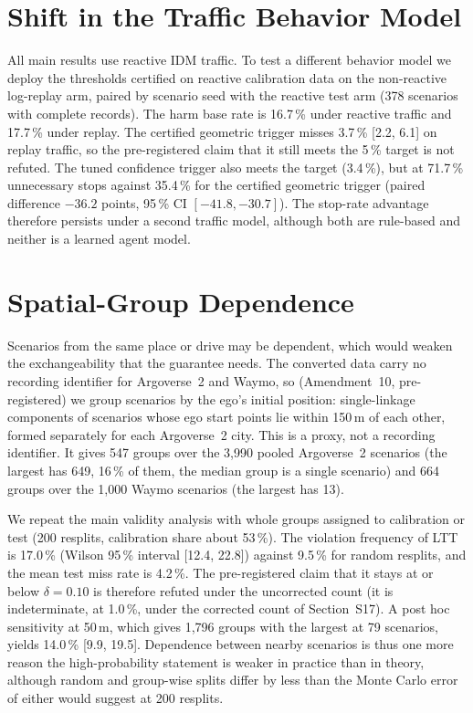 \documentclass[lettersize,journal]{IEEEtran}
\begin{document}
\section{Shift in the Traffic Behavior Model}
\label{sec:s-behavior}
All main results use reactive IDM traffic. To test a different behavior
model we deploy the thresholds certified on reactive calibration data on
the non-reactive log-replay arm, paired by scenario seed with the reactive
test arm (378 scenarios with complete records). The harm base rate is
16.7\,\% under reactive traffic and 17.7\,\% under replay. The certified
geometric trigger misses 3.7\,\% [2.2, 6.1] on replay traffic, so the
pre-registered claim that it still meets the 5\,\% target is not
refuted. The tuned confidence trigger also meets the target (3.4\,\%), but at
71.7\,\% unnecessary stops against 35.4\,\% for the certified geometric
trigger (paired difference $-36.2$ points, 95\,\% CI $[-41.8, -30.7]$). The
stop-rate advantage therefore persists under a second traffic model, although
both are rule-based and neither is a learned agent model.

\section{Spatial-Group Dependence}
\label{sec:s-spatial}
Scenarios from the same place or drive may be dependent, which would
weaken the exchangeability that the guarantee needs. The converted data
carry no recording identifier for Argoverse~2 and Waymo, so
(Amendment~10, pre-registered) we group scenarios by the ego's initial
position: single-linkage components of scenarios whose ego start points lie
within 150\,m of each other, formed separately for each Argoverse~2 city.
This is a proxy, not a recording identifier. It gives 547 groups over the
3{,}990 pooled Argoverse~2 scenarios (the largest has 649, 16\,\% of them, the
median group is a single scenario) and 664 groups over the 1{,}000 Waymo
scenarios (the largest has 13).

We repeat the main validity analysis with whole groups assigned to
calibration or test (200 resplits, calibration share about 53\,\%). The
violation frequency of LTT is 17.0\,\% (Wilson 95\,\% interval [12.4, 22.8])
against 9.5\,\% for random resplits, and the mean test miss rate is 4.2\,\%.
The pre-registered claim that it stays at or below $\delta = 0.10$ is
therefore refuted under the uncorrected count (it is indeterminate, at 1.0\,\%, under the corrected count of Section~S17). A post hoc sensitivity at 50\,m, which gives 1{,}796
groups with the largest at 79 scenarios, yields 14.0\,\% [9.9, 19.5].
Dependence between nearby scenarios is thus one more reason the
high-probability statement is weaker in practice than in theory, although
random and group-wise splits differ by less than the Monte Carlo error of
either would suggest at 200 resplits.
\end{document}
